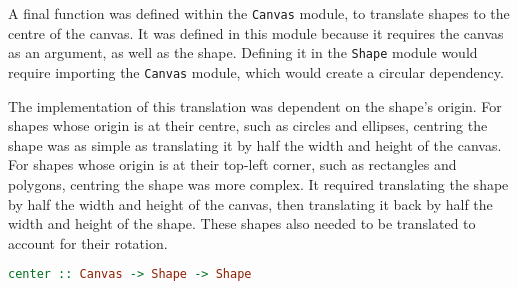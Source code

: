 \documentclass[../main.tex]{subfiles}
\begin{document}
        A final function was defined within the \texttt{Canvas} module, to translate
            shapes to the centre of the canvas.
        It was defined in this module because it requires the canvas as an argument, as
            well as the shape.
        Defining it in the \texttt{Shape} module would require importing the
            \texttt{Canvas} module, which would create a circular dependency.

        The implementation of this translation was dependent on the shape's origin.
        For shapes whose origin is at their centre, such as circles and ellipses,
            centring the shape was as simple as translating it by half the width and height
            of the canvas.
        For shapes whose origin is at their top-left corner, such as rectangles and
            polygons, centring the shape was more complex.
        It required translating the shape by half the width and height of the canvas,
            then translating it back by half the width and height of the shape.
        These shapes also needed to be translated to account for their rotation.

        \begin{lstlisting}[language={Haskell}, label={lst:centre}, caption={The \texttt{centre} 
            function.}]
center :: Canvas -> Shape -> Shape\end{lstlisting}
\end{document}
